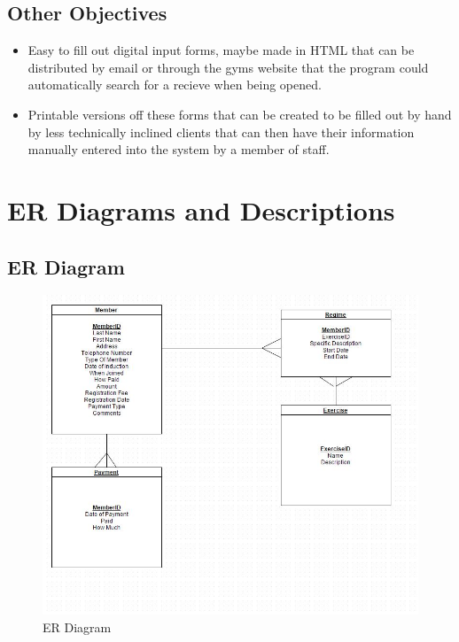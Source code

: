 \subsection{Other Objectives}

\begin{itemize}
     \item Easy to fill out digital input forms, maybe made in HTML that can be distributed by email or through the gyms website that the program could automatically search for a recieve when being opened.
        \item Printable versions off these forms that can be created to be filled out by hand by less technically inclined clients that can then have their information manually entered into the system by a member of staff.
        
\end{itemize}

\section{ER Diagrams and Descriptions}


\subsection{ER Diagram}

\begin{figure}[H]
    \includegraphics[width=\textwidth]{-ERDiagram.JPG}
    \caption{ER Diagram} \label{fig: ER Diagram}
\end{figure}


